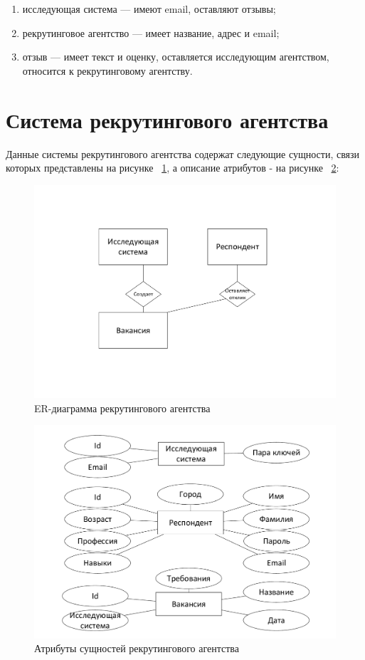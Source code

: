 \begin{enumerate}
\item исследующая система — имеют email, оставляют отзывы;
\item рекрутинговое агентство — имеет название, адрес и email;
\item отзыв — имеет текст и оценку, оставляется исследующим агентством, относится к рекрутинговому агентству.
\end{enumerate}

\section{Система рекрутингового агентства}
Данные системы рекрутингового агентства содержат следующие сущности, связи которых представлены на рисунке ~\ref{fig:er-recruiting}, а описание атрибутов - на рисунке ~\ref{fig:er-recruiting-at}:

\begin{figure}[ht]
  \centering
  \includegraphics[width=\textwidth]{include/er-recruiting.pdf}
\caption{ER-диаграмма рекрутингового агентства}
\label{fig:er-recruiting}
\end{figure}

\begin{figure}[ht]
  \centering
  \includegraphics[width=\textwidth]{include/er-recruiting-at.pdf}
\caption{Атрибуты сущностей рекрутингового агентства}
\label{fig:er-recruiting-at}
\end{figure}

